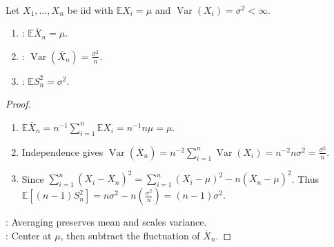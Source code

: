 \begin{theorem} \label{thm:sample-mean-and-variance-moments} \\
Let $X_1,\ldots,X_n$ be iid with $\mathbb{E}X_i=\mu$ and $\operatorname{Var}(X_i)=\sigma^2<\infty$.
\begin{enumerate}[label=(\roman*)]
\setlength{\itemsep}{0pt}
\item {}: $\mathbb{E}\overline{X}_n=\mu$.
\item {}: $\operatorname{Var}(\overline{X}_n)=\frac{\sigma^2}{n}$.
\item {}: $\mathbb{E}S_n^2=\sigma^2$.
\end{enumerate}
\begin{proof}
\begin{enumerate}[label=(\roman*)]
\setlength{\itemsep}{0pt}
\item $\mathbb{E}\overline{X}_n=n^{-1}\sum\limits_{i=1}^{n}\mathbb{E}X_i=n^{-1}n\mu=\mu$.
\item Independence gives $\operatorname{Var}(\overline{X}_n)=n^{-2}\sum\limits_{i=1}^{n}\operatorname{Var}(X_i)=n^{-2}n\sigma^2=\frac{\sigma^2}{n}$.
\item Since $\sum\limits_{i=1}^{n}(X_i-\overline{X}_n)^2=\sum\limits_{i=1}^{n}(X_i-\mu)^2-n(\overline{X}_n-\mu)^2$. Thus $\mathbb{E}[(n-1)S_n^2]=n\sigma^2-n(\frac{\sigma^2}{n})=(n-1)\sigma^2$.
\end{enumerate}
: Averaging preserves mean and scales variance.\\
: Center at $\mu$, then subtract the fluctuation of $\overline{X}_n$.
\end{proof}
\end{theorem}


